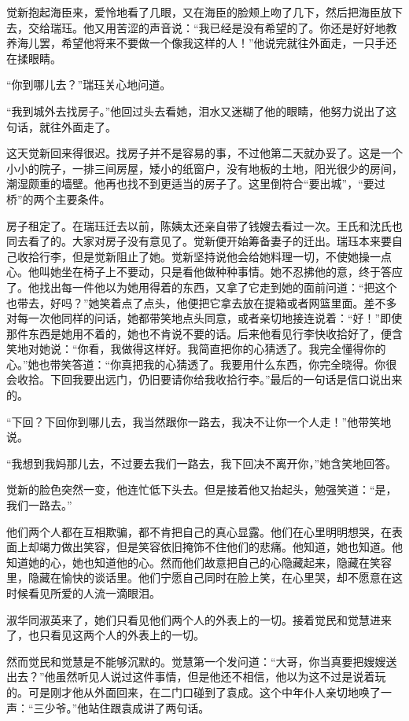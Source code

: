 \par 觉新抱起海臣来，爱怜地看了几眼，又在海臣的脸颊上吻了几下，然后把海臣放下去，交给瑞珏。他又用苦涩的声音说：“我已经是没有希望的了。你还是好好地教养海儿罢，希望他将来不要做一个像我这样的人！”他说完就往外面走，一只手还在揉眼睛。
\par “你到哪儿去？”瑞珏关心地问道。
\par “我到城外去找房子。”他回过头去看她，泪水又迷糊了他的眼睛，他努力说出了这句话，就往外面走了。
\par 这天觉新回来得很迟。找房子并不是容易的事，不过他第二天就办妥了。这是一个小小的院子，一排三间房屋，矮小的纸窗户，没有地板的土地，阳光很少的房间，潮湿颇重的墙壁。他再也找不到更适当的房子了。这里倒符合“要出城”，“要过桥”的两个主要条件。
\par 房子租定了。在瑞珏迁去以前，陈姨太还亲自带了钱嫂去看过一次。王氏和沈氏也同去看了的。大家对房子没有意见了。觉新便开始筹备妻子的迁出。瑞珏本来要自己收拾行李，但是觉新阻止了她。觉新坚持说他会给她料理一切，不使她操一点心。他叫她坐在椅子上不要动，只是看他做种种事情。她不忍拂他的意，终于答应了。他找出每一件他以为她用得着的东西，又拿了它走到她的面前问道：“把这个也带去，好吗？”她笑着点了点头，他便把它拿去放在提箱或者网篮里面。差不多对每一次他同样的问话，她都带笑地点头同意，或者亲切地接连说着：“好！”即使那件东西是她用不着的，她也不肯说不要的话。后来他看见行李快收拾好了，便含笑地对她说：“你看，我做得这样好。我简直把你的心猜透了。我完全懂得你的心。”她也带笑答道：“你真把我的心猜透了。我要用什么东西，你完全晓得。你很会收拾。下回我要出远门，仍旧要请你给我收拾行李。”最后的一句话是信口说出来的。
\par “下回？下回你到哪儿去，我当然跟你一路去，我决不让你一个人走！”他带笑地说。
\par “我想到我妈那儿去，不过要去我们一路去，我下回决不离开你，”她含笑地回答。
\par 觉新的脸色突然一变，他连忙低下头去。但是接着他又抬起头，勉强笑道：“是，我们一路去。”
\par 他们两个人都在互相欺骗，都不肯把自己的真心显露。他们在心里明明想哭，在表面上却竭力做出笑容，但是笑容依旧掩饰不住他们的悲痛。他知道，她也知道。他知道她的心，她也知道他的心。然而他们故意把自己的心隐藏起来，隐藏在笑容里，隐藏在愉快的谈话里。他们宁愿自己同时在脸上笑，在心里哭，却不愿意在这时候看见所爱的人流一滴眼泪。
\par 淑华同淑英来了，她们只看见他们两个人的外表上的一切。接着觉民和觉慧进来了，也只看见这两个人的外表上的一切。
\par 然而觉民和觉慧是不能够沉默的。觉慧第一个发问道：“大哥，你当真要把嫂嫂送出去？”他虽然听见人说过这件事情，但是他还不相信，他以为这不过是说着玩的。可是刚才他从外面回来，在二门口碰到了袁成。这个中年仆人亲切地唤了一声：“三少爷。”他站住跟袁成讲了两句话。
